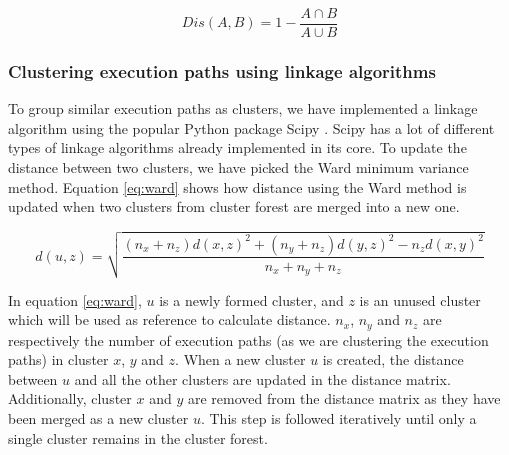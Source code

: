 \begin{equation}
Dis(A, B) = 1 - \frac{A\cap B}{A\cup B}
\label{eq:jaccard}
\end{equation}

\subsubsection{Clustering execution paths using linkage algorithms}

To group similar execution paths as clusters, we have implemented a linkage algorithm using the popular Python package Scipy \cite{scipy}. Scipy has a lot of different types of linkage algorithms already implemented in its core. To update the distance between two clusters, we have picked the Ward \cite{ward} minimum variance method. Equation \ref{eq:ward} \cite{scipy} shows how distance using the Ward method is updated when two clusters from cluster forest are merged into a new one.

\begin{equation}
     d(u, z) =   \sqrt{\frac{(n_x+n_z)d(x,z)^2+ (n_y+n_z)d(y,z)^2 - n_z d(x,y)^2 }{n_x+n_y+n_z}}
    \label{eq:ward}
\end{equation}

 
In equation \ref{eq:ward}, $u$ is a newly formed cluster, and $z$ is an unused cluster which will be used as reference to calculate distance. $n_x$, $n_y$ and $n_z$ are respectively the number of execution paths (as we are clustering the execution paths) in cluster $x$, $y$ and $z$.
When a new cluster $u$ is created, the distance between $u$ and all the other clusters are updated in the distance matrix. Additionally, cluster $x$ and $y$ are removed from the distance matrix as they have been merged as a new cluster $u$. This step is followed iteratively until only a single cluster remains in the cluster forest. 

